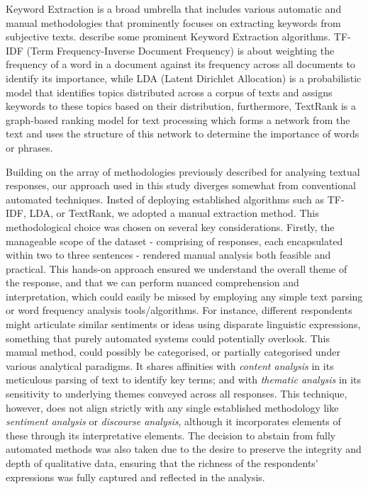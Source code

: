 Keyword Extraction \parencite{Firoozeh2020KeywordMethods, Bharti2017AutomaticSurvey} is a broad umbrella that includes various automatic and manual methodologies that prominently focuses on extracting keywords from subjective texts. \textcite{Yuan2018TextStrategy} describe some prominent Keyword Extraction algorithms. TF-IDF (Term Frequency-Inverse Document Frequency) is about weighting the frequency of a word in a document against its frequency across all documents to identify its importance, while LDA (Latent Dirichlet Allocation) is a probabilistic model that identifies topics distributed across a corpus of texts and assigns keywords to these topics based on their distribution, furthermore, TextRank is a graph-based ranking model for text processing which forms a network from the text and uses the structure of this network to determine the importance of words or phrases. 

Building on the array of methodologies previously described for analysing textual responses, our approach used in this study diverges somewhat from conventional automated techniques. Insted of deploying established algorithms such as TF-IDF, LDA, or TextRank, we adopted a manual extraction method. This methodological choice was chosen on several key considerations. Firstly, the manageable scope of the dataset - comprising of \participantCount{} responses, each encapsulated within two to three sentences - rendered manual analysis both feasible and practical. This hands-on approach ensured we understand the overall theme of the response, and that we can perform nuanced comprehension and interpretation, which could easily be missed by employing any simple text parsing or word frequency analysis tools/algorithms. For instance, different respondents might articulate similar sentiments or ideas using disparate linguistic expressions, something that purely automated systems could potentially overlook. This manual method, could possibly be categorised, or partially categorised under various analytical paradigms. It shares affinities with \textit{content analysis} in its meticulous parsing of text to identify key terms; and with \textit{thematic analysis} in its sensitivity to underlying themes conveyed across all responses. This technique, however, does not align strictly with any single established methodology like \textit{sentiment analysis} or \textit{discourse analysis}, although it incorporates elements of these through its interpretative elements. The decision to abstain from fully automated methods was also taken due to the desire to preserve the integrity and depth of qualitative data, ensuring that the richness of the respondents' expressions was fully captured and reflected in the analysis. 

